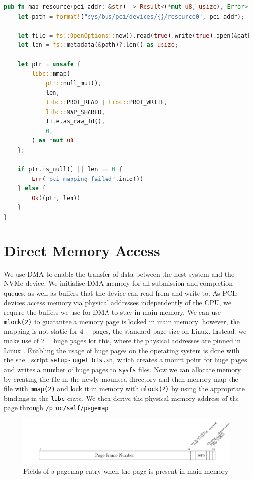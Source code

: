 \begin{lstlisting}[float, language=Rust,label=lst:mmap,caption=Memory mapping a PCIe resource in Rust]
pub fn map_resource(pci_addr: &str) -> Result<(*mut u8, usize), Error> {
    let path = format!("sys/bus/pci/devices/{}/resource0", pci_addr);

    let file = fs::OpenOptions::new().read(true).write(true).open(&path)?;
    let len = fs::metadata(&path)?.len() as usize;

    let ptr = unsafe {
        libc::mmap(
            ptr::null_mut(),
            len,
            libc::PROT_READ | libc::PROT_WRITE,
            libc::MAP_SHARED,
            file.as_raw_fd(),
            0,
        ) as *mut u8
    };

    if ptr.is_null() || len == 0 {
        Err("pci mapping failed".into())
    } else {
        Ok((ptr, len))
    }
}
\end{lstlisting}

\section{Direct Memory Access}
We use DMA to enable the transfer of data between the host system and the NVMe device. We initialise DMA memory for all submission and completion queues, as well as buffers that the device can read from and write to.
As PCIe devices access memory via physical addresses independently of the CPU, we require the buffers we use for DMA to stay in main memory. We can use \texttt{mlock(2)} to guarantee a memory page is locked in main memory; however, the mapping is not static for \qty{4}{\kibi\byte} pages, the standard page size on Linux. Instead, we make use of \qty{2}{\mebi\byte} huge pages for this, where the physical addresses are pinned in Linux \cite{user_space_net}.
Enabling the usage of huge pages on the operating system is done with the shell script \texttt{setup-hugetlbfs.sh}, which creates a mount point for huge pages and writes a number of huge pages to \texttt{sysfs} files. Now we can allocate memory by creating the file in the newly mounted directory and then memory map the file with \texttt{mmap(2)} and lock it in memory with \texttt{mlock(2)} by using the appropriate bindings in the \texttt{libc} crate. We then derive the physical memory address of the page through \texttt{/proc/self/pagemap}.

\begin{figure}[H]
  \centering
    \includegraphics[width=\textwidth]{figures/pagemap}
    \caption{Fields of a pagemap entry when the page is present in main memory}
    \label{fig:pagemap}
\end{figure}

